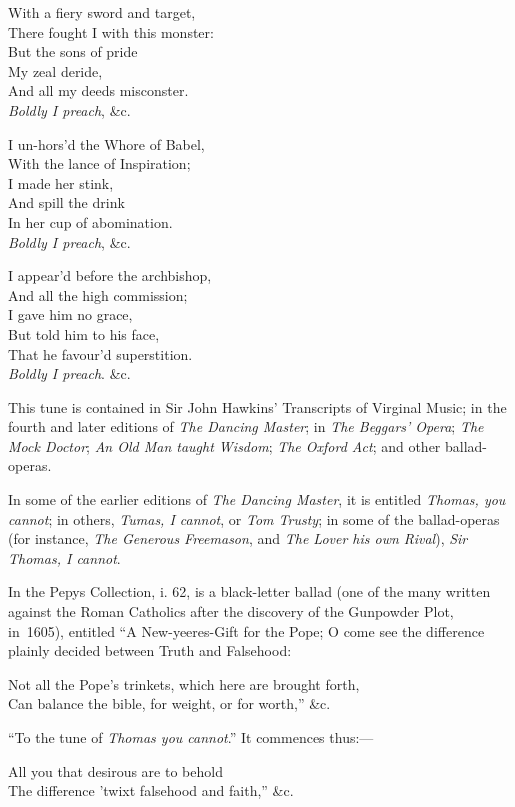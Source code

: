 \begin{dcverse}
\begin{patverse}
With a fiery sword and target,\\
There fought I with this monster:\\
But the sons of pride\\
My zeal deride,\\
And all my deeds misconster.\\
\textit{Boldly I preach}, \&c.
\end{patverse}

\begin{patverse}
I un-hors’d the Whore of Babel,\\
With the lance of Inspiration;\\
I made her stink,\\
And spill the drink\\
In her cup of abomination.\\
\textit{Boldly I preach}, \&c.
\end{patverse}

\begin{patverse}
I appear’d before the archbishop,\\
And all the high commission;\\
I gave him no grace,\\
But told him to his face,\\
That he favour’d superstition.\\
\textit{Boldly I preach}. \&c.
\end{patverse}
\end{dcverse}


This tune is contained in Sir John Hawkins’ Transcripts of Virginal Music; in
the fourth and later editions of \textit{The Dancing Master}; in \textit{The Beggars’ Opera};
\textit{The Mock Doctor}; \textit{An Old Man taught Wisdom}; \textit{The Oxford Act}; and other
ballad-operas.

In some of the earlier editions of \textit{The Dancing Master}, it is entitled\textit{ Thomas,
you cannot}; in others, \textit{Tumas, I cannot}, or \textit{Tom Trusty}; in some of the ballad-operas
(for instance, \textit{The Generous Freemason}, and \textit{The Lover his own Rival}),
\textit{Sir Thomas, I cannot}.

In the Pepys Collection, i. 62, is a black-letter ballad (one of the many written
against the Roman Catholics after the discovery of the Gunpowder Plot, in~1605),
entitled “A New-yeeres-Gift for the Pope; O come see the difference plainly
decided between Truth and Falsehood:
\settowidth{\versewidth}{Not all the Pope’s trinkets, which here are brought forth,}
\begin{scverse}
Not all the Pope’s trinkets, which here are brought forth,\\
Can balance the bible, for weight, or for worth,” \&c.
\end{scverse}
“To the tune of \textit{Thomas you cannot}.” It commences thus:—
\begin{scverse}
All you that desirous are to behold\\
The difference ’twixt falsehood and faith,” \&c.
\end{scverse}

